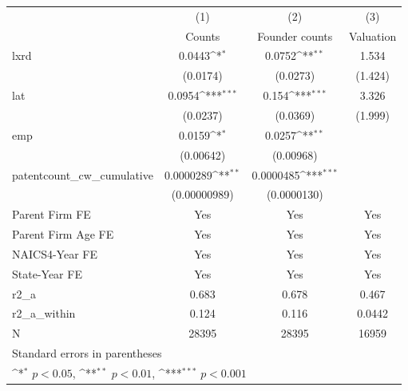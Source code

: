 {
\def\sym#1{\ifmmode^{#1}\else\(^{#1}\)\fi}
\begin{tabular}{l*{3}{c}}
\hline\hline
            &\multicolumn{1}{c}{(1)}&\multicolumn{1}{c}{(2)}&\multicolumn{1}{c}{(3)}\\
            &\multicolumn{1}{c}{Counts}&\multicolumn{1}{c}{Founder counts}&\multicolumn{1}{c}{Valuation}\\
\hline
lxrd        &      0.0443\sym{*}  &      0.0752\sym{**} &       1.534         \\
            &    (0.0174)         &    (0.0273)         &     (1.424)         \\
[1em]
lat         &      0.0954\sym{***}&       0.154\sym{***}&       3.326         \\
            &    (0.0237)         &    (0.0369)         &     (1.999)         \\
[1em]
emp         &      0.0159\sym{*}  &      0.0257\sym{**} &                     \\
            &   (0.00642)         &   (0.00968)         &                     \\
[1em]
patentcount\_cw\_cumulative&   0.0000289\sym{**} &   0.0000485\sym{***}&                     \\
            &(0.00000989)         & (0.0000130)         &                     \\
[1em]
Parent Firm FE&         Yes         &         Yes         &         Yes         \\
[1em]
Parent Firm Age FE&         Yes         &         Yes         &         Yes         \\
[1em]
NAICS4-Year FE&         Yes         &         Yes         &         Yes         \\
[1em]
State-Year FE&         Yes         &         Yes         &         Yes         \\
\hline
r2\_a        &       0.683         &       0.678         &       0.467         \\
r2\_a\_within &       0.124         &       0.116         &      0.0442         \\
N           &       28395         &       28395         &       16959         \\
\hline\hline
\multicolumn{4}{l}{\footnotesize Standard errors in parentheses}\\
\multicolumn{4}{l}{\footnotesize \sym{*} \(p<0.05\), \sym{**} \(p<0.01\), \sym{***} \(p<0.001\)}\\
\end{tabular}
}
